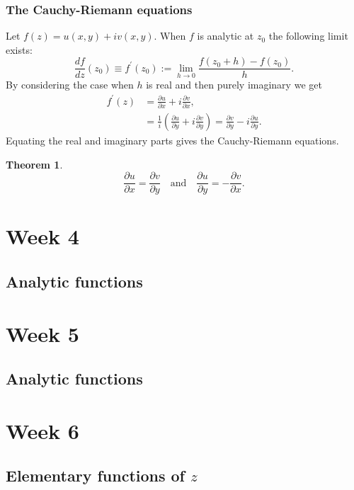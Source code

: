 \documentclass{article}
\newtheorem{theorem}{Theorem}
\begin{document}
\subsubsection{The Cauchy-Riemann equations}
Let $f(z)=u(x,y)+iv(x,y)$. When $f$ is analytic at $z_0$ the following limit exists:
\begin{equation}
    \frac{df}{dz}(z_0)\equiv f^\prime(z_0):=\lim_{h\to 0}\frac{f(z_0+h)-f(z_0)}{h}.
\end{equation}
By considering the case when $h$ is real and then purely imaginary we get
\begin{align}
    f^\prime(z) &= \frac{\partial u}{\partial x}+i\frac{\partial v}{\partial x}, \\
    &= \frac{1}{i}\left( \frac{\partial u}{\partial y}+i\frac{\partial v}{\partial y} \right) = \frac{\partial v}{\partial y} -i\frac{\partial u}{\partial y}.
\end{align}
Equating the real and imaginary parts gives the Cauchy-Riemann equations.
\begin{theorem}
    \begin{equation}
        \frac{\partial u}{\partial x} = \frac{\partial v}{\partial y}\quad\text{and}\quad\frac{\partial u}{\partial y}=-\frac{\partial v}{\partial x}.
    \end{equation}
\end{theorem}

\section{Week 4}
\subsection{Analytic functions}

\section{Week 5}
\subsection{Analytic functions}

\section{Week 6}
\subsection{Elementary functions of $z$}
\end{document}
